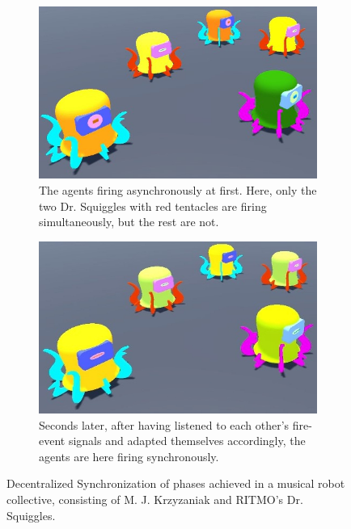 	\begin{figure}[h]
		\centering
			\begin{subfigure}[t]{.5\textwidth}
				\centering\captionsetup{width=.9\linewidth}%
				\includegraphics[width=0.9\linewidth]{Assets/Figures/IntroUnsynch.jpg}
				\caption{The agents firing asynchronously at first. Here, only the two Dr. Squiggles with red tentacles are firing simultaneously, but the rest are not.}
				\label{fig:initial:unsynch}
			\end{subfigure}%
			\begin{subfigure}[t]{.5\textwidth}
				\centering\captionsetup{width=.9\linewidth}%
				\includegraphics[width=0.9\linewidth]{Assets/Figures/IntroSynch.jpg}
				\caption{Seconds later, after having listened to each other's fire-event signals and adapted themselves accordingly, the agents are here firing synchronously.}
				\label{fig:initial:synch}
			\end{subfigure}
		\caption{Decentralized Synchronization of phases achieved in a musical robot collective, consisting of M. J. Krzyzaniak and RITMO's Dr. Squiggles.}
		\label{fig:initial}
	\end{figure}

